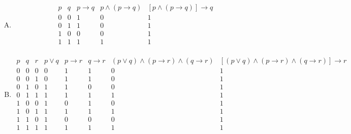 {{\begin{practices}
\begin{enumerate}[A.]
{\begin{table}[H]
\[\begin{array}{c|c|c|c|c|c|c|c}
                            \end{array}
                        \]
                    \end{table}
                }
                \item
                {
                    \begin{table}[H]
                        \[
                            \begin{array}{c|c|c|c|c}
                                \hline
                                p & q & p \rightarrow q & p \wedge (p \rightarrow q) & [p \wedge (p \rightarrow q)] \rightarrow q \\
                                \hline
                                0 & 0 & 1 & 0 & 1 \\
                                0 & 1 & 1 & 0 & 1 \\
                                1 & 0 & 0 & 0 & 1 \\
                                1 & 1 & 1 & 1 & 1 \\
                            \end{array}
                        \]
                    \end{table}
                }
                \item
                {
                    \begin{table}[H]
                        \[
                            \begin{array}{c|c|c|c|c|c|c|c}
                                \hline
                                p & q & r & p \vee q & p \rightarrow r & q \rightarrow r & (p \vee q) \wedge (p \rightarrow r) \wedge (q \rightarrow r) & [(p \vee q) \wedge (p \rightarrow r) \wedge (q \rightarrow r)] \rightarrow r \\
                                \hline
                                0 & 0 & 0 & 0 & 1 & 1 & 0 & 1 \\
                                0 & 0 & 1 & 0 & 1 & 1 & 0 & 1 \\
                                0 & 1 & 0 & 1 & 1 & 0 & 0 & 1 \\
                                0 & 1 & 1 & 1 & 1 & 1 & 1 & 1 \\
                                1 & 0 & 0 & 1 & 0 & 1 & 0 & 1 \\
                                1 & 0 & 1 & 1 & 1 & 1 & 1 & 1 \\
                                1 & 1 & 0 & 1 & 0 & 0 & 0 & 1 \\
                                1 & 1 & 1 & 1 & 1 & 1 & 1 & 1 \\
                            \end{array}
                        \]
                    \end{table}
                }
            \end{enumerate}
        \end{practices}

}}
